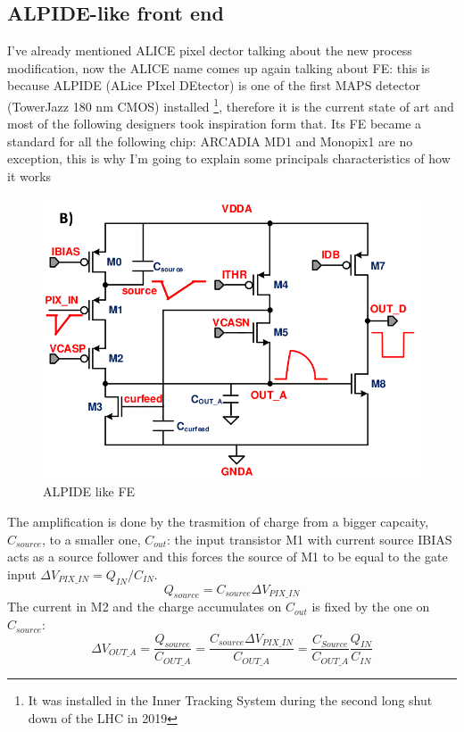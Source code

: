    \subsection{ALPIDE-like front end}
      I've already mentioned ALICE pixel dector talking about the new process modification, now the ALICE name comes up again talking about FE: this is because ALPIDE (ALice PIxel DEtector) is one of the first MAPS detector (TowerJazz 180 nm CMOS) installed \footnote{It was installed in the Inner Tracking System during the second long shut down of the LHC in 2019}, therefore it is the current state of art and most of the following designers took inspiration form that. Its FE became a standard for all the following chip: ARCADIA MD1 and Monopix1 are no exception, this is why I'm going to explain some principals characteristics of how it works\cite{ALPIDE-FE}
      \begin{figure}[h!]
         \centering
         \includegraphics[width=.7\linewidth]{figures/Pixel_detectors/ALPIDE_FE.png}
         \caption{ALPIDE like FE}
         \label{fig:ALPIDE-like}
      \end{figure}
      The amplification is done by the trasmition of charge from a bigger capcaity, $C_{source}$, to a smaller one, $C_{out}$: the input transistor M1 with current source IBIAS acts as a source follower and this forces the source of M1 to be equal to the gate input  $\Delta V_{PIX\_IN} = Q_{IN}/C_{IN}$.
      \begin{equation}
         Q_{source} = C_{source} \Delta V_{PIX\_IN}
      \end{equation}
      The current in M2 and the charge accumulates on $C_{out}$ is fixed by the one on $C_{source}$:
      \begin{equation}
         \Delta V_{OUT\_A} = \frac{Q_{source}}{C_{OUT\_A}} = \frac{C_{source}\Delta V_{PIX\_IN}}{C_{OUT\_A}}  = \frac{C_{Source}}{C_{OUT\_A}}\frac{Q_{IN}}{C_{IN}}
      \end{equation}


